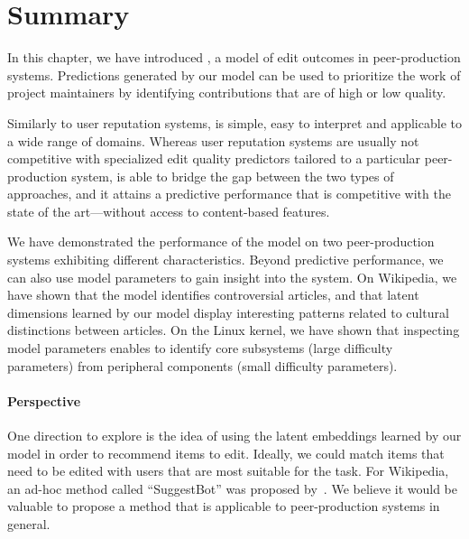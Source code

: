 \section{Summary}
\label{pps:sec:conclusion}

In this chapter, we have introduced \interank{}, a model of edit outcomes in peer-production systems.
Predictions generated by our model can be used to prioritize the work of project maintainers by identifying contributions that are of high or low quality.

Similarly to user reputation systems, \interank{} is simple, easy to interpret and applicable to a wide range of domains.
Whereas user reputation systems are usually not competitive with specialized edit quality predictors tailored to a particular peer-production system, \interank{} is able to bridge the gap between the two types of approaches, and it attains a predictive performance that is competitive with the state of the art---without access to content-based features.

We have demonstrated the performance of the model on two peer-production systems exhibiting different characteristics.
Beyond predictive performance, we can also use model parameters to gain insight into the system.
On Wikipedia, we have shown that the model identifies controversial articles, and that latent dimensions learned by our model display interesting patterns related to cultural distinctions between articles.
On the Linux kernel, we have shown that inspecting model parameters enables to identify core subsystems (large difficulty parameters) from peripheral components (small difficulty parameters).

\paragraph{Perspective}
One direction to explore is the idea of using the latent embeddings learned by our model in order to recommend items to edit.
Ideally, we could match items that need to be edited with users that are most suitable for the task.
For Wikipedia, an ad-hoc method called ``SuggestBot'' was proposed by~\citet{cosley2007suggestbot}.
We believe it would be valuable to propose a method that is applicable to peer-production systems in general.
